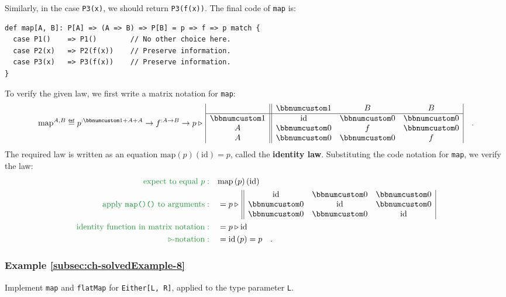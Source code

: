 Similarly, in the case \lstinline!P3(x)!, we should return \lstinline!P3(f(x))!.
The final code of \lstinline!map! is:
\begin{lstlisting}
def map[A, B]: P[A] => (A => B) => P[B] = p => f => p match {
  case P1()    => P1()        // No other choice here.
  case P2(x)   => P2(f(x))    // Preserve information.
  case P3(x)   => P3(f(x))    // Preserve information.
}
\end{lstlisting}

To verify the given law, we first write a matrix notation for \lstinline!map!:
\[
\text{map}^{A,B}\triangleq p^{:\bbnum 1+A+A}\rightarrow f^{:A\rightarrow B}\rightarrow p\triangleright\,\begin{array}{|c||ccc|}
 & \bbnum 1 & B & B\\
\hline \bbnum 1 & \text{id} & \bbnum 0 & \bbnum 0\\
A & \bbnum 0 & f & \bbnum 0\\
A & \bbnum 0 & \bbnum 0 & f
\end{array}\quad.
\]
The required law is written as an equation $\text{map}\left(p\right)(\text{id})=p$,
called the \textbf{identity
law}. Substituting the code notation for \lstinline!map!, we verify
the law:
\begin{align*}
{\color{greenunder}\text{expect to equal }p:}\quad & \text{map}\left(p\right)(\text{id})\\
{\color{greenunder}\text{apply \texttt{map()()} to arguments}:}\quad & =p\triangleright\,\begin{array}{||ccc|}
\text{id} & \bbnum 0 & \bbnum 0\\
\bbnum 0 & \text{id} & \bbnum 0\\
\bbnum 0 & \bbnum 0 & \text{id}
\end{array}\\
{\color{greenunder}\text{identity function in matrix notation}:}\quad & =p\triangleright\text{id}\\
{\color{greenunder}\triangleright\text{-notation}:}\quad & =\text{id}\left(p\right)=p\quad.
\end{align*}


\subsubsection{Example \label{subsec:ch-solvedExample-8}\ref{subsec:ch-solvedExample-8}}

Implement \lstinline!map! and \lstinline!flatMap! for \lstinline!Either[L, R]!,
applied to the type parameter \lstinline!L!.

